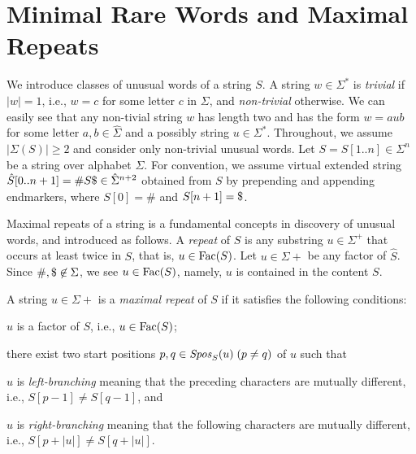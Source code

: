 \section{Minimal Rare Words and Maximal Repeats}
\label{sec:mrep}

We introduce classes of unusual words of a string $S$.
A string $w \in \Sigma^*$ is \textit{trivial} if $|w| = 1$, i.e., $w = c$ for some letter $c$ in $\Sigma$, and \textit{non-trivial} otherwise.
We can easily see that any non-tivial string $w$ has length two and has the form $w = aub$ for some letter $a, b \in \hat\Sigma$ and a possibly string $u \in \Sigma^*$. Throughout, we assume $|\Sigma(S)|\ge 2$ and consider only non-trivial unusual words.
Let $S = S[1..n] \in \Sigma^n$ be a string over alphabet $\Sigma$.
For convention, we assume virtual extended string $\hat S[0..n+1] = \# S\daller \in \hat\Sigma^{n+2}$ obtained from $S$ by prepending and appending endmarkers, where $S[0] = \#$ and $S[n+1] = \daller$.

Maximal repeats of a string is a fundamental concepts in discovery of unusual words, and introduced as follows.  
A \textit{repeat} of $S$ is any substring $u \in \Sigma^+$ that occurs at least twice in $S$, that is, $u \in \Fac(S)$.
Let $u \in \Sigma+$ be any factor of $\hat S$. Since $\#, \daller \not\in \Sigma$, we see $u \in \Fac(S)$, namely, $u$ is contained in the content $S$.

\begin{definition}\rm 
A string $u \in \Sigma+$ is a \textit{maximal repeat} of $S$ if it satisfies the following conditions: 
\begin{enumerate*}[(1)]
\item $u$ is a factor of $S$, i.e., $u \in \Fac(S)$;  
\item there exist two start positions $p, q \in \Spos[S](u)\;(p\not= q)$ of $u$ such that
  \begin{enumerate*}[(i)]
  \item $u$ is \textit{left-branching} meaning that the preceding characters are mutually different, i.e., $S[p-1] \not= S[q-1]$, and
  \item $u$ is \textit{right-branching} meaning that the following characters are mutually different, i.e., $S[p+|u|] \not= S[q+|u|]$. 
  \end{enumerate*}
\end{enumerate*}
\end{definition}

